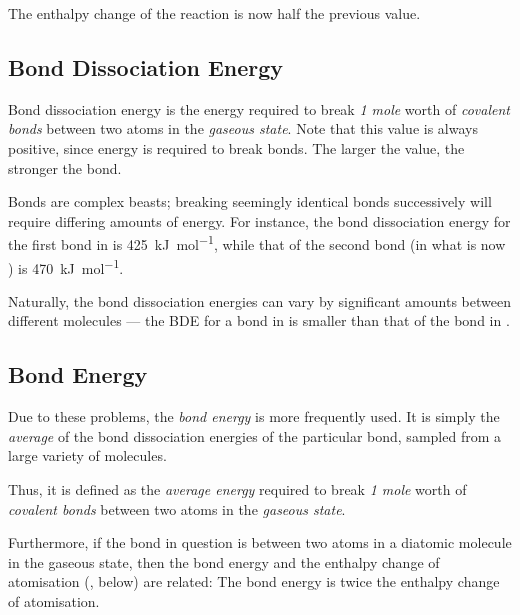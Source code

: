 
			The enthalpy change of the reaction is now half the previous value.


		\pagebreak
		\subsection{Bond Dissociation Energy}

			Bond dissociation energy is the energy required to break \textit{1 mole} worth of \textit{covalent bonds} between two atoms in the
			\textit{gaseous state}. Note that this value is always positive, since energy is required to break bonds. The larger the value,
			the stronger the bond.

			Bonds are complex beasts; breaking seemingly identical bonds successively will require differing amounts of energy. For instance, the
			bond dissociation energy for the first  bond in  is \SI{425}{\kilo\joule\per\mole}, while that of the second 
			bond (in what is now ) is \SI{470}{\kilo\joule\per\mole}.

			Naturally, the bond dissociation energies can vary by significant amounts between different molecules --- the BDE for a  bond
			in  is smaller than that of the  bond in .


		\subsection{Bond Energy}

			Due to these problems, the \textit{bond energy} is more frequently used. It is simply the \textit{average} of the bond dissociation
			energies of the particular bond, sampled from a large variety of molecules.

			Thus, it is defined as the \textit{average energy} required to break \textit{1 mole} worth of \textit{covalent bonds} between two
			atoms in the \textit{gaseous state}.

			Furthermore, if the bond in question is between two atoms in a diatomic molecule in the gaseous state, then the bond energy and
			the enthalpy change of atomisation (, below) are related: The bond energy is twice the enthalpy change of atomisation.

